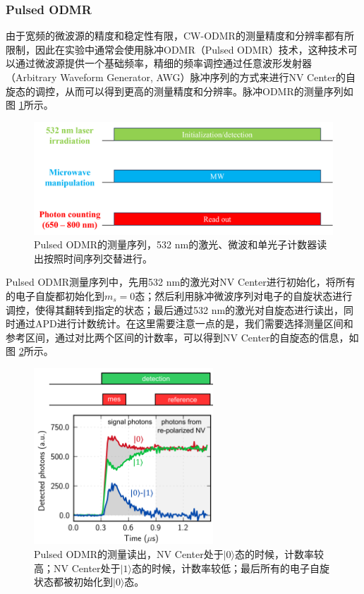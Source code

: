 \documentclass[type = bachelor]{whu-thesis}
\begin{document}
\subsubsection{Pulsed ODMR}

由于宽频的微波源的精度和稳定性有限，CW-ODMR的测量精度和分辨率都有所限制，因此在实验中通常会使用脉冲ODMR（Pulsed ODMR）技术，这种技术可以通过微波源提供一个基础频率，精细的频率调控通过任意波形发射器（Arbitrary Waveform Generator, AWG）脉冲序列的方式来进行NV Center的自旋态的调控，从而可以得到更高的测量精度和分辨率。脉冲ODMR的测量序列如图 \ref{fig: Pulsed ODMR_seq}所示。

\begin{figure}
  \centering
  \includegraphics[width=1.0\textwidth]{figures/Chapter 1/CW-ODMR_seq.png}
  \caption[Pulsed ODMR的测量序列]{Pulsed ODMR的测量序列，532 nm的激光、微波和单光子计数器读出按照时间序列交替进行。}
  \label{fig: Pulsed ODMR_seq}
\end{figure}

Pulsed ODMR测量序列中，先用532 nm的激光对NV Center进行初始化，将所有的电子自旋都初始化到$m_s=0$态；然后利用脉冲微波序列对电子的自旋状态进行调控，使得其翻转到指定的状态；最后通过532 nm的激光对自旋态进行读出，同时通过APD进行计数统计。在这里需要注意一点的是，我们需要选择测量区间和参考区间，通过对比两个区间的计数率，可以得到NV Center的自旋态的信息，如图 \ref{fig: mes_ref}所示。

\begin{figure}
  \centering
  \includegraphics[width=0.6\textwidth]{figures/Chapter 1/mes_ref.png}
  \caption[Pulsed ODMR的测量读出]{Pulsed ODMR的测量读出，NV Center处于$|0\rangle$态的时候，计数率较高；NV Center处于$|1\rangle$态的时候，计数率较低；最后所有的电子自旋状态都被初始化到$|0\rangle$态\cite{staudacher2015nuclear}。}
  \label{fig: mes_ref}
\end{figure}
\end{document}
